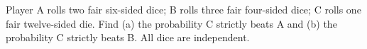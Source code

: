 Player A rolls two fair six-sided dice; B rolls three fair four-sided dice; C rolls one fair twelve-sided die. Find (a) the probability C strictly beats A and (b) the probability C strictly beats B. All dice are independent.
